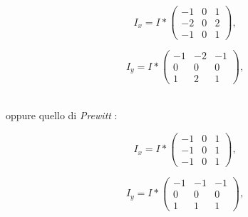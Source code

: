 \vspace*{15pt}
\noindent\begin{minipage}{.5\linewidth}
	\begin{equation}
		I_{x} = I * 
			\begin{pmatrix}
				-1 & 0 & 1 \\
				-2 & 0 & 2\\
				-1 & 0 & 1
			\end{pmatrix},
		\label{eq:sobel-x}
	\end{equation}
\end{minipage}%
\begin{minipage}{.5\linewidth}
	\begin{equation}
		I_{y} = I * 
			\begin{pmatrix}
				-1 & -2 & -1 \\
				0 & 0 & 0\\
				1 & 2 & 1
			\end{pmatrix},
		\label{eq:sobel-y}
	\end{equation}
\end{minipage}\\
oppure quello di \textit{Prewitt} \cite{bib:prewitt}:\\
\noindent\begin{minipage}{.5\linewidth}
	\begin{equation}
		I_{x} = I * 
			\begin{pmatrix}
				-1 & 0 & 1 \\
				-1 & 0 & 1\\
				-1 & 0 & 1
			\end{pmatrix},
		\label{eq:prewitt-x}
	\end{equation}
\end{minipage}%
\begin{minipage}{.5\linewidth}
	\begin{equation}
		I_{y} = I * 
			\begin{pmatrix}
				-1 & -1 & -1 \\
				0 & 0 & 0\\
				1 & 1 & 1
			\end{pmatrix},
		\label{eq:prewitt-y}
	\end{equation}
\end{minipage}


